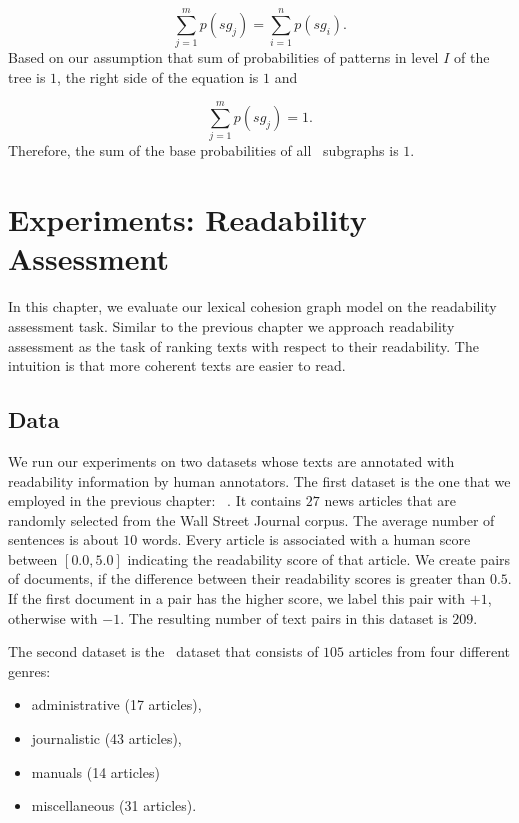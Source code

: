 \begin{equation*}
\sum_{j=1}^m p(sg_j) = \sum_{i=1}^n p(sg_i).
\end{equation*}
%
Based on our assumption that sum of probabilities of patterns in level $I$ of the tree is $1$, the right side of the equation is $1$ and 

\begin{equation*}
\sum_{j=1}^m p(sg_j) = 1.
\end{equation*}
%
Therefore, the sum of the base probabilities of all \kplusnode\ subgraphs is $1$. \QEDB



\section{Experiments: Readability Assessment}
\label{sec:experiments}
In this chapter, we evaluate our lexical cohesion graph model on the readability assessment task. 
Similar to the previous chapter we approach readability assessment as the task of ranking texts with respect to their readability. 
The intuition is that more coherent texts are easier to
read. 


\subsection{Data}
We run our experiments on two datasets whose texts are annotated with readability information by human annotators.
The first dataset is the one that we employed in the previous chapter: \pitlerds\ \cite{pitler08}. 
It contains $27$ news articles that are randomly selected from
the Wall Street Journal corpus. 
%
The average number of sentences is about $10$ words. 
Every article is associated with a human score between $[0.0,5.0]$ indicating the readability score of that article. 
We create pairs of documents, if the difference between their readability scores is greater than $0.5$. 
If the first document in a pair has the higher score, we label
this pair with $+1$, otherwise with $-1$. 
The resulting number of text pairs in this dataset is $209$.

The second dataset is the \declercqds\ dataset that consists of $105$ articles from four different genres: 
\begin{itemize}
  \item  administrative (17 articles), 
  \item  journalistic (43 articles), 
  \item manuals (14 articles)
  \item miscellaneous (31 articles). 
\end{itemize}

